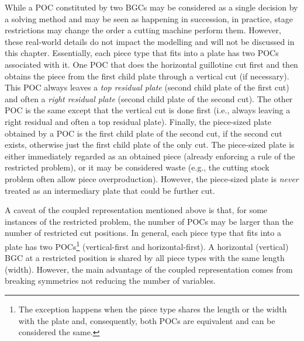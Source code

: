 \documentclass[ppgc,tese,english,formais,babel]{iiufrgs}
\begin{document}
While a POC constituted by two BGCs may be considered as a single decision by a solving method and may be seen as happening in succession, in practice, stage restrictions may change the order a cutting machine perform them.
However, these real-world details do not impact the modelling and will not be discussed in this chapter.
Essentially, each piece type that fits into a plate has two POCs associated with it.
One POC that does the horizontal guillotine cut first and then obtains the piece from the first child plate through a vertical cut (if necessary).
This POC always leaves a \emph{top residual plate} (second child plate of the first cut) and often a \emph{right residual plate} (second child plate of the second cut).
The other POC is the same except that the vertical cut is done first (i.e., always leaving a right residual and often a top residual plate).
Finally, the piece-sized plate obtained by a POC is the first child plate of the second cut, if the second cut exists, otherwise just the first child plate of the only cut.
The piece-sized plate is either immediately regarded as an obtained piece (already enforcing a rule of the restricted problem), or it may be considered waste (e.g., the cutting stock problem often allow piece overproduction).
However, the piece-sized plate is \emph{never} treated as an intermediary plate that could be further cut.

A caveat of the coupled representation mentioned above is that, for some instances of the restricted problem, the number of POCs may be larger than the number of restricted cut positions.
In general, each piece type that fits into a plate has two POCs\footnote{The exception happens when the piece type shares the length or the width with the plate and, consequently, both POCs are equivalent and can be considered the same.} (vertical-first and horizontal-first).
A horizontal (vertical) BGC at a restricted position is shared by all piece types with the same length (width).
However, the main advantage of the coupled representation comes from breaking symmetries not reducing the number of variables.
\end{document}
